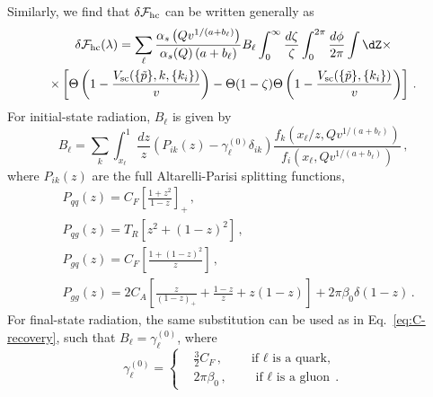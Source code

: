 Similarly, we find that $\delta \mathcal{F}_{\rm hc}$ can be written generally as
 \begin{multline}
   \label{eq:dFhc-ISR}
   \delta\mathcal{F}_{\rm hc}(\lambda)=\sum_\ell \frac{\alpha_s\left(Qv^{1/(a+b_\ell)}\right)}{\alpha_s(Q)\left(a+b_\ell\right)}B_\ell \int_0^{\infty}\frac{d\zeta}{\zeta}\int_0^{2\pi}\frac{d\phi}{2\pi}
 \int \dZ  \times\\ \times  \left[\Theta\left(1-\frac{V_{\mathrm{sc}}(\{\tilde{p}\},k,\{k_i\})}{v}\right) -\Theta(1-\zeta)\Theta\left(1-\frac{V_{\mathrm{sc}}(\{\tilde{p}\},\{k_i\})}{v}\right)\right]\,.
 \end{multline}
 For initial-state radiation, $B_\ell$ is given by
 \begin{equation}
   \label{eq:Bell-ISR}
B_\ell=\sum_k\int_{x_{\ell}}^1 \frac{dz}{z} \left(P_{ik}(z)-\gamma_\ell^{(0)}\delta_{ik}\right) \frac{f_k(x_{\ell}/z,Qv^{1/(a+b_\ell)})}{f_i(x_\ell,Qv^{1/(a+b_\ell)})}  \,,
 \end{equation}
 where $P_{ik}(z)$ are the full Altarelli-Parisi splitting functions,
 \begin{subequations}
 \label{eq:full-AP}
\begin{align}
	&P_{qq}(z)=C_F\left[\frac{1+z^2}{1-z}\right]_+\,,\\
	&P_{qg}(z)=T_R\left[z^2+(1-z)^2\right]\,,\\
	&P_{gq}(z)=C_F\left[\frac{1+(1-z)^2}{z}\right]\,,\\
	&P_{gg}(z)=2C_A\left[\frac{z}{(1-z)_+}+\frac{1-z}{z}+z(1-z)\right]+2\pi\beta_0\delta(1-z)\,.
\end{align}
 \end{subequations}
  For final-state radiation, the same substitution can be
  used as in Eq.~\eqref{eq:C-recovery}, such that $B_\ell=\gamma_\ell^{(0)}$,
 where 
 \begin{equation}
  \gamma_\ell^{(0)} = \left\{
    \begin{split}
      & \frac{3}{2}C_F\,,\qquad\text{if $\ell$ is a quark,} \\
      & 2\pi \beta_0 \,,\qquad\text{if $\ell$ is a gluon}\,.
    \end{split}
    \right.
\end{equation}


